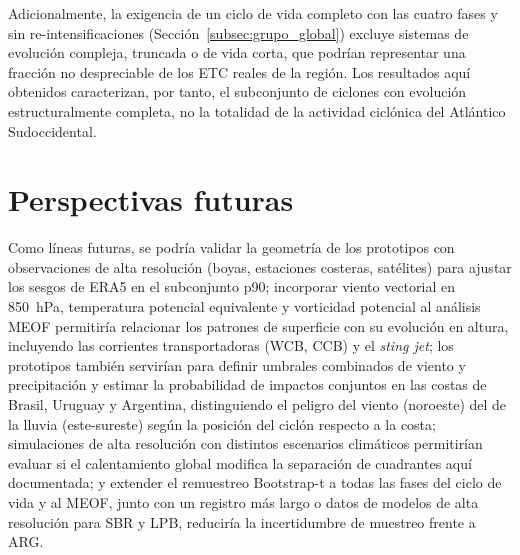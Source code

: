 Adicionalmente, la exigencia de un ciclo de vida completo con las cuatro fases y sin re-intensificaciones (Sección~\ref{subsec:grupo_global}) excluye sistemas de evolución compleja, truncada o de vida corta, que podrían representar una fracción no despreciable de los ETC reales de la región. Los resultados aquí obtenidos caracterizan, por tanto, el subconjunto de ciclones con evolución estructuralmente completa, no la totalidad de la actividad ciclónica del Atlántico Sudoccidental.

\section{Perspectivas futuras}

Como líneas futuras, se podría validar la geometría de los prototipos con observaciones de alta resolución (boyas, estaciones costeras, satélites) para ajustar los sesgos de ERA5 en el subconjunto p90; incorporar viento vectorial en 850~hPa, temperatura potencial equivalente y vorticidad potencial al análisis MEOF permitiría relacionar los patrones de superficie con su evolución en altura, incluyendo las corrientes transportadoras (WCB, CCB) y el \textit{sting jet}; los prototipos también servirían para definir umbrales combinados de viento y precipitación y estimar la probabilidad de impactos conjuntos en las costas de Brasil, Uruguay y Argentina, distinguiendo el peligro del viento (noroeste) del de la lluvia (este-sureste) según la posición del ciclón respecto a la costa; simulaciones de alta resolución con distintos escenarios climáticos permitirían evaluar si el calentamiento global modifica la separación de cuadrantes aquí documentada; y extender el remuestreo Bootstrap-t a todas las fases del ciclo de vida y al MEOF, junto con un registro más largo o datos de modelos de alta resolución para SBR y LPB, reduciría la incertidumbre de muestreo frente a ARG.
